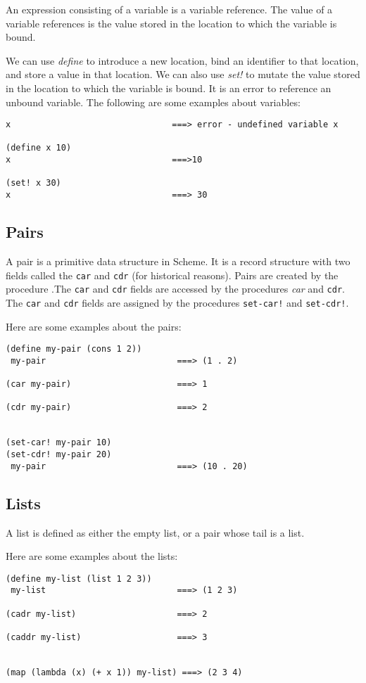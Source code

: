 \documentclass{article}
\begin{document}
An expression consisting of a variable is a variable reference. The value of a variable references is the value stored in the location to which the variable is bound.

We can use \emph{define} to introduce a new location, bind an identifier to that location, and store a value in that location. We can also use \emph{set!} to mutate the value stored in the location to which the variable is bound. It is an error to reference an unbound variable. The following are some examples about variables:

\begin{lstlisting}
x                                ===> error - undefined variable x

(define x 10)
x                                ===>10

(set! x 30)
x                                ===> 30
\end{lstlisting}

\subsection*{Pairs}
A pair is a primitive data structure in Scheme. It is a record structure with two fields called the \texttt{car} and \texttt{cdr} (for historical reasons). Pairs are created by the procedure .The \texttt{car} and \texttt{cdr} fields are accessed by the procedures \textit{car} and \texttt{cdr}. The \texttt{car} and \texttt{cdr} fields are assigned by the procedures \texttt{set-car!} and \texttt{set-cdr!}.

Here are some examples about the pairs:
\begin{lstlisting}
(define my-pair (cons 1 2))
 my-pair                          ===> (1 . 2)

(car my-pair)                     ===> 1

(cdr my-pair)                     ===> 2


(set-car! my-pair 10)
(set-cdr! my-pair 20)
 my-pair                          ===> (10 . 20)
\end{lstlisting}


\subsection*{Lists}
A list is defined as either the empty list, or a pair whose tail is a list.

Here are some examples about the lists:
\begin{lstlisting}
(define my-list (list 1 2 3))
 my-list                          ===> (1 2 3)

(cadr my-list)                    ===> 2

(caddr my-list)                   ===> 3


(map (lambda (x) (+ x 1)) my-list) ===> (2 3 4)
\end{lstlisting}
\end{document}
